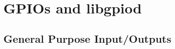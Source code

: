 \chapter{GPIOs and libgpiod}
\section*{General Purpose Input/Outputs}

\alelogo

\minitoc

\clearpage






















